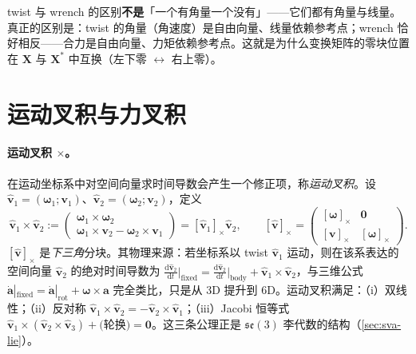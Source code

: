 \begin{insight}
twist 与 wrench 的区别\textbf{不是}「一个有角量一个没有」——它们都有角量与线量。真正的区别是：twist 的角量（角速度）是自由向量、线量依赖参考点；wrench 恰好相反——合力是自由向量、力矩依赖参考点。这就是为什么变换矩阵的零块位置在 $\mathbf X$ 与 $\mathbf X^*$ 中互换（左下零 $\leftrightarrow$ 右上零）。
\end{insight}

\section{运动叉积与力叉积}
\label{sec:sva-cross}

\paragraph{运动叉积 $\times$。}
在运动坐标系中对空间向量求时间导数会产生一个修正项，称\emph{运动叉积}。设 $\hat{\mathbf v}_1=(\boldsymbol\omega_1;\mathbf v_1)$、$\hat{\mathbf v}_2=(\boldsymbol\omega_2;\mathbf v_2)$，定义
\begin{equation}
  \hat{\mathbf v}_1\times\hat{\mathbf v}_2:=\begin{pmatrix}\boldsymbol\omega_1\times\boldsymbol\omega_2\\ \boldsymbol\omega_1\times\mathbf v_2-\boldsymbol\omega_2\times\mathbf v_1\end{pmatrix}
  =[\hat{\mathbf v}_1]_\times\hat{\mathbf v}_2,
  \qquad
  [\hat{\mathbf v}]_\times=\begin{pmatrix}[\boldsymbol\omega]_\times&\mathbf 0\\ [\mathbf v]_\times&[\boldsymbol\omega]_\times\end{pmatrix}.
  \label{eq:sva-crm}
\end{equation}
$[\hat{\mathbf v}]_\times$ 是\emph{下三角}分块。其物理来源：若坐标系以 twist $\hat{\mathbf v}_1$ 运动，则在该系表达的空间向量 $\hat{\mathbf v}_2$ 的绝对时间导数为
$\frac{\mathrm d\hat{\mathbf v}_2}{\mathrm dt}\big|_{\text{fixed}}=\frac{\mathrm d\hat{\mathbf v}_2}{\mathrm dt}\big|_{\text{body}}+\hat{\mathbf v}_1\times\hat{\mathbf v}_2$，与三维公式 $\dot{\mathbf a}|_{\text{fixed}}=\dot{\mathbf a}|_{\text{rot}}+\boldsymbol\omega\times\mathbf a$ 完全类比，只是从 3D 提升到 6D。运动叉积满足：（i）双线性；（ii）反对称 $\hat{\mathbf v}_1\times\hat{\mathbf v}_2=-\hat{\mathbf v}_2\times\hat{\mathbf v}_1$；（iii）Jacobi 恒等式 $\hat{\mathbf v}_1\times(\hat{\mathbf v}_2\times\hat{\mathbf v}_3)+\text{(轮换)}=\mathbf 0$。这三条公理正是 $\mathfrak{se}(3)$ 李代数的结构（\cref{sec:sva-lie}）。

